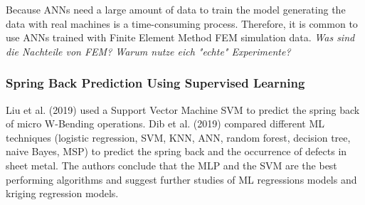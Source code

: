 Because \ac{ANN}s need a large amount of data to train the model generating the data with real machines is a time-consuming process.
Therefore, it is common to use \ac{ANN}s trained with Finite Element Method \ac{FEM} simulation data.
\textit{Was sind die Nachteile von FEM? Warum nutze eich "echte" Experimente?}

\subsubsection*{Spring Back Prediction Using Supervised Learning}
Liu et al. (2019) used a Support Vector Machine \ac{SVM} to predict the spring back of micro W-Bending operations. \cite{liu_springbackpredictionforming_2019} 
Dib et al. (2019) compared different \ac{ML} techniques (logistic regression, SVM, KNN, ANN, random forest, decision tree, naive Bayes, MSP) to predict the spring back and the occurrence of defects in sheet metal. \cite[p. 1]{dib_singleensembleclassifiers_2020}
The authors conclude that the MLP and the SVM are the best performing algorithms and suggest further studies of ML regressions models and kriging regression models. \cite[p. 13]{dib_singleensembleclassifiers_2020}

